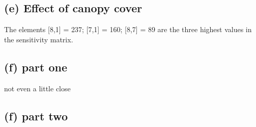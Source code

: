\documentclass[]{article}
\begin{document}
\subsection{(e) Effect of canopy cover}\label{e-effect-of-canopy-cover}

The elements {[}8,1{]} = 237; {[}7,1{]} = 160; {[}8,7{]} = 89 are the
three highest values in the sensitivity matrix.

\subsection{(f) part one}\label{f-part-one}

not even a little close

\subsection{(f) part two}\label{f-part-two}
\end{document}
